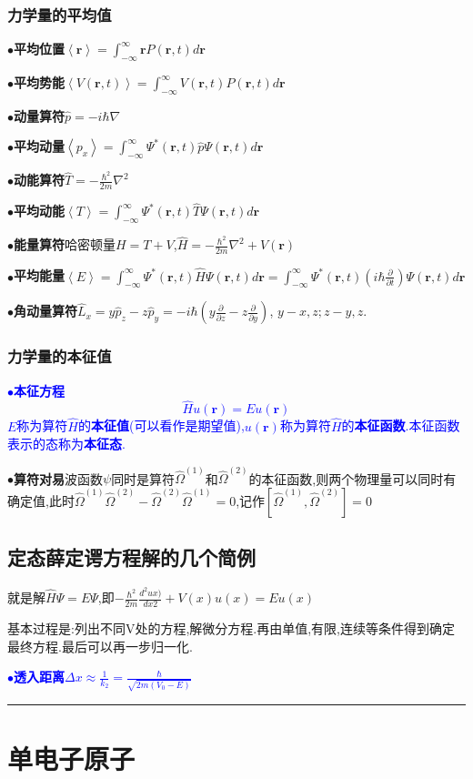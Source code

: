 \documentclass[UTF8]{article}
\newcommand{\keypoint}[2]{$\bullet$\textbf{#1}\quad#2\par}
\newcommand{\vr}{\bm{r}}
\newcommand{\average}[1]{\left\langle #1\right\rangle }
\begin{document}
\subsubsection{力学量的平均值}
\keypoint{平均位置}{$\average{\vr} =\int_{-\infty}^{\infty}\vr P(\vr,t)d\vr $}
\keypoint{平均势能}{$\average{V(\vr,t)} =\int_{-\infty}^{\infty}V(\vr,t) P(\vr,t)d\vr $}
\keypoint{动量算符}{$\hat{p}=-i\hbar\nabla$}
\keypoint{平均动量}{$\average{p_{x}} = \int_{-\infty}^{\infty}\Psi^{*}(\vr,t)\hat{p}\Psi(\vr,t)d\vr $}
\keypoint{动能算符}{$\hat{T}=-\frac{\hbar^{2}}{2m}\nabla^{2}$}
\keypoint{平均动能}{$\average{T} = \int_{-\infty}^{\infty}\Psi^{*}(\vr,t)\hat{T}\Psi(\vr,t)d\vr $}
\keypoint{能量算符}{哈密顿量$H=T+V$,$\hat{H}=-\frac{\hbar^{2}}{2m}\nabla^{2}+V(\vr)$}
\keypoint{平均能量}{$\average{E} = \int_{-\infty}^{\infty}\Psi^{*}(\vr,t)\hat{H}\Psi(\vr,t)d\vr =\int_{-\infty}^{\infty}\Psi^{*}(\vr,t)\left( i\hbar\frac{\partial}{\partial t}\right) \Psi(\vr,t)d\vr$}
\keypoint{角动量算符}{$\hat{L}_x=y\hat{p}_z-z\hat{p}_y=-i\hbar\left(y\frac{\partial}{\partial z}-z\frac{\partial}{\partial y}\right)$, $y-x,z;z-y,z$.}
\subsubsection{力学量的本征值}
\textcolor{blue}{\keypoint{本征方程}{
	$$\hat{H}u(\bm{r})=Eu(\bm{r})$$
	$E$称为算符$\hat{H}$的\textbf{本征值}(可以看作是期望值),$u(\bm{r})$称为算符$\hat{H}$的\textbf{本征函数}.本征函数表示的态称为\textbf{本征态}.
}}	
\keypoint{算符对易}{波函数$\psi$同时是算符$\hat{\Omega}^{(1)}$和$\hat{\Omega}^{(2)}$的本征函数,则两个物理量可以同时有确定值,此时$\hat{\Omega}^{(1)}\hat{\Omega}^{(2)}-\hat{\Omega}^{(2)}\hat{\Omega}^{(1)}=0$,记作$[\hat{\Omega}^{(1)},\hat{\Omega}^{(2)}]=0$}
\subsection{定态薛定谔方程解的几个简例}
就是解$\hat{H}\Psi=E\Psi$,即$-\frac{\hbar^{2}}{2m}\frac{d^{2}ux)}{dx{2}}+V(x)u(x)=Eu(x)$\par
基本过程是:列出不同V处的方程,解微分方程.再由单值,有限,连续等条件得到确定最终方程.最后可以再一步归一化.\par
\textcolor{blue}{\keypoint{透入距离}{$\Delta x\approx\frac{1}{k_2}=\frac{\hbar}{\sqrt{2m(V_0-E)}}$}} 
\rule{\textwidth}{0.50mm}



\section{单电子原子}
\end{document}
